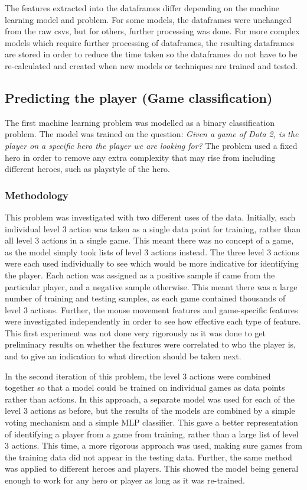 \documentclass{../sty/SizheArticle}
\begin{document}
The features extracted into the dataframes differ depending on the machine learning model and problem. For some models, the dataframes were unchanged from the raw csvs, but for others, further processing was done. For more complex models which require further processing of dataframes, the resulting dataframes are stored in order to reduce the time taken so the dataframes do not have to be re-calculated and created when new models or techniques are trained and tested. 

\subsection{Predicting the player (Game classification)}
The first machine learning problem was modelled as a binary classification problem. The model was trained on the question: \textit{Given a game of Dota 2, is the player on a specific hero the player we are looking for?} The problem used a fixed hero in order to remove any extra complexity that may rise from including different heroes, such as playstyle of the hero. 


\subsubsection{Methodology}
This problem was investigated with two different uses of the data.  Initially, each individual level 3 action was taken as a single data point for training, rather than all level 3 actions in a single game. This meant there was no concept of a game, as the model simply took lists of level 3 actions instead. The three level 3 actions were each used individually to see which would be more indicative for identifying the player. Each action was assigned as a positive sample if came from the particular player, and a negative sample otherwise. This meant there was a large number of training and testing samples, as each game contained thousands of level 3 actions. Further, the mouse movement features and game-specific features were investigated independently in order to see how effective each type of feature. This first experiment was not done very rigorously as it was done to get preliminary results on whether the features were correlated to who the player is, and to give an indication to what direction should be taken next. 

In the second iteration of this problem, the level 3 actions were combined together so that a model could be trained on individual games as data points rather than actions. In this approach, a separate model was used for each of the level 3 actions as before, but the results of the models are combined by a simple voting mechanism and a simple MLP classifier. This gave a better representation of identifying a player from a game from training, rather than a large list of level 3 actions. This time, a more rigorous approach was used, making sure games from the training data did not appear in the testing data. Further, the same method was applied to different heroes and players. This showed the model being general enough to work for any hero or player as long as it was re-trained. 
\end{document}
